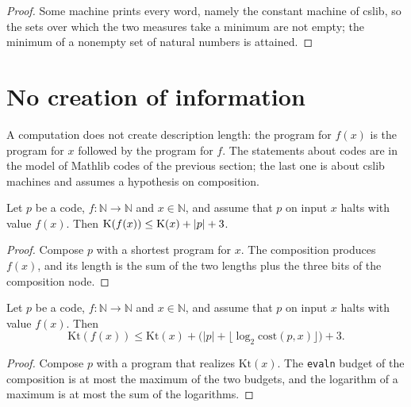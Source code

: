 \begin{proof}
  \leanok
  Some machine prints every word, namely the constant machine of cslib, so the sets over which the
  two measures take a minimum are not empty; the minimum of a nonempty set of natural numbers is
  attained.
\end{proof}

\section{No creation of information}
\label{sec:information-no-creation}

A computation does not create description length: the program for $f(x)$ is the program for $x$
followed by the program for $f$. The statements about codes are in the model of Mathlib codes of
the previous section; the last one is about cslib machines and assumes a hypothesis on composition.

\begin{theorem}
  \label{thm:information-no-creation}
  \leanok
  Let $p$ be a code, $f : \mathbb{N} \to \mathbb{N}$ and $x \in \mathbb{N}$, and assume that $p$
  on input $x$ halts with value $f(x)$. Then $\mathrm{K}(f(x)) \le \mathrm{K}(x) + |p| + 3$.
  \own{}
\end{theorem}

\begin{proof}
  \leanok
  Compose $p$ with a shortest program for $x$. The composition produces $f(x)$, and its length is
  the sum of the two lengths plus the three bits of the composition node.
\end{proof}

\begin{theorem}
  \label{thm:information-no-creation-kt}
  \leanok
  Let $p$ be a code, $f : \mathbb{N} \to \mathbb{N}$ and $x \in \mathbb{N}$, and assume that $p$
  on input $x$ halts with value $f(x)$. Then
  \[
    \mathrm{Kt}(f(x)) \le \mathrm{Kt}(x) + \bigl(|p| + \lfloor \log_2 \mathrm{cost}(p, x) \rfloor\bigr) + 3 .
  \]
  \own{}
\end{theorem}

\begin{proof}
  \leanok
  Compose $p$ with a program that realizes $\mathrm{Kt}(x)$. The \texttt{evaln} budget of the
  composition is at most the maximum of the two budgets, and the logarithm of a maximum is at most
  the sum of the logarithms.
\end{proof}

